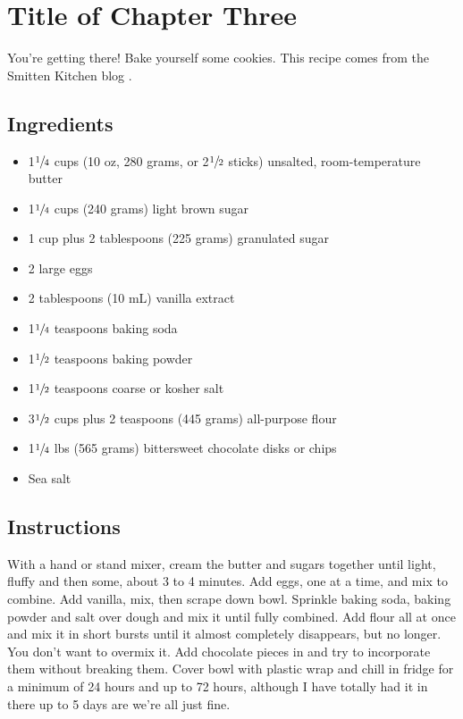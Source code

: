 \chapter{Title of Chapter Three}

You're getting there! Bake yourself some cookies. This recipe comes from the Smitten Kitchen blog \cite{cookierecipe}.

\section{Ingredients}

\begin{itemize}
    \item 1$\sfrac{1}{4}$ cups (10 oz, 280 grams, or 2$\sfrac{1}{2}$ sticks) unsalted, room-temperature butter
    \item 1$\sfrac{1}{4}$ cups (240 grams) light brown sugar
    \item 1 cup plus 2 tablespoons (225 grams) granulated sugar
    \item 2 large eggs
    \item 2 tablespoons (10 mL) vanilla extract
    \item 1$\sfrac{1}{4}$ teaspoons baking soda
    \item 1$\sfrac{1}{2}$ teaspoons baking powder
    \item 1$\sfrac{1}{2}$ teaspoons coarse or kosher salt
    \item 3$\sfrac{1}{2}$ cups plus 2 teaspoons (445 grams) all-purpose flour
    \item 1$\sfrac{1}{4}$ lbs (565 grams) bittersweet chocolate disks or chips
    \item Sea salt
\end{itemize}

\section{Instructions}

With a hand or stand mixer, cream the butter and sugars together until light, fluffy and then some, about 3 to 4 minutes. Add eggs, one at a time, and mix to combine. Add vanilla, mix, then scrape down bowl. Sprinkle baking soda, baking powder and salt over dough and mix it until fully combined. Add flour all at once and mix it in short bursts until it almost completely disappears, but no longer. You don’t want to overmix it. Add chocolate pieces in and try to incorporate them without breaking them. Cover bowl with plastic wrap and chill in fridge for a minimum of 24 hours and up to 72 hours, although I have totally had it in there up to 5 days are we’re all just fine.

